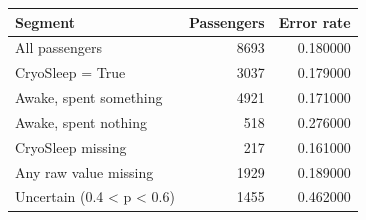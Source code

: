 \begin{tabular}{lrr}
\toprule
Segment & Passengers & Error rate \\
\midrule
All passengers & 8693 & 0.180000 \\
CryoSleep = True & 3037 & 0.179000 \\
Awake, spent something & 4921 & 0.171000 \\
Awake, spent nothing & 518 & 0.276000 \\
CryoSleep missing & 217 & 0.161000 \\
Any raw value missing & 1929 & 0.189000 \\
Uncertain (0.4 < p < 0.6) & 1455 & 0.462000 \\
\bottomrule
\end{tabular}
